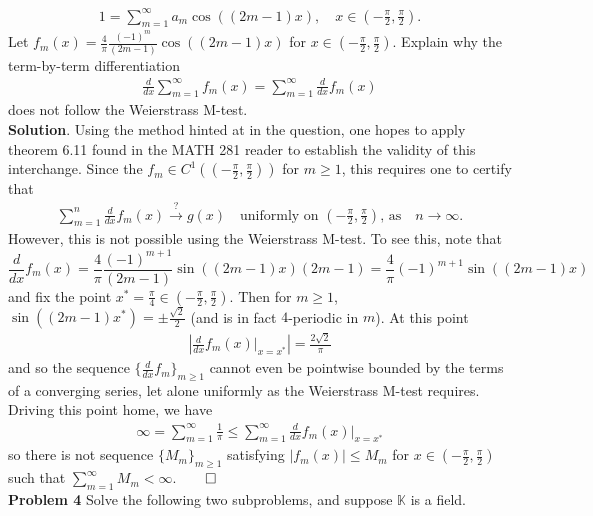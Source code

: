 \documentclass[10pt]{article}
\newcommand{\mbb}[1]{\mathbb{#1}}
\newcommand{\1}[1]{\mathbbm{1}_{#1}}
\begin{document}
    \begin{align*}
        1=\sum_{m=1}^\infty a_m\cos((2m-1)x),\quad x\in(-\tfrac{\pi}{2},\tfrac{\pi}{2}).
    \end{align*}
    Let $f_m(x)=\tfrac{4}{\pi}\tfrac{(-1)^m}{(2m-1)}\cos((2m-1)x)$ for $x\in(-\tfrac{\pi}{2},\tfrac{\pi}{2})$. Explain why the term-by-term differentiation
    \begin{align*}
        \frac{d}{dx}\sum_{m=1}^\infty f_m(x)=\sum_{m=1}^\infty\frac{d}{dx}f_m(x)
    \end{align*}
    does not follow the Weierstrass M-test.\\[5pt]
    {\bf Solution}. Using the method hinted at in the question, one hopes to apply theorem 6.11 found in the MATH 281 reader to establish the validity of this interchange.
    Since the $f_m\in C^1((-\tfrac{\pi}{2},\tfrac{\pi}{2}))$ for $m\geq 1$, this requires one to certify that
    \begin{align*}
        \sum_{m=1}^n\frac{d}{dx}f_m(x)\overset{?}{\rightarrow} g(x)\quad\text{uniformly on $(-\tfrac{\pi}{2},\tfrac{\pi}{2})$, as}\quad n\rightarrow\infty.
    \end{align*}
    However, this is not possible using the Weierstrass M-test. To see this, note that
    \[\frac{d}{dx}f_m(x)=\frac{4}{\pi}\frac{(-1)^{m+1}}{(2m-1)}\sin((2m-1)x)(2m-1)=\frac{4}{\pi}(-1)^{m+1}\sin((2m-1)x)\]
    and fix the point $x^\ast=\tfrac{\pi}{4}\in(-\tfrac{\pi}{2},\tfrac{\pi}{2})$. Then for $m\geq 1$, $\sin((2m-1)x^\ast)=\pm\tfrac{\sqrt{2}}{2}$ (and is in fact $4$-periodic in $m$). At this point
    \begin{align*}
        \left|\frac{d}{dx}f_m(x)\big|_{x=x^\ast}\right|=\frac{2\sqrt{2}}{\pi}
    \end{align*}
    and so the sequence $\{\tfrac{d}{dx}f_m\}_{m\geq 1}$ cannot even be pointwise bounded by the terms of a converging series, let alone uniformly as
    the Weierstrass M-test requires. Driving this point home, we have
    \begin{align*}
        \infty=\sum_{m=1}^\infty\frac{1}{\pi}\leq \sum_{m=1}^\infty\frac{d}{dx}f_m(x)\big|_{x=x^\ast}
    \end{align*}
    so there is not sequence $\{M_m\}_{m\geq 1}$ satisfying $|f_m(x)|\leq M_m$ for $x\in(-\tfrac{\pi}{2},\tfrac{\pi}{2})$ such that $\sum_{m=1}^\infty M_m<\infty$.\hfill{$\qed$}\\[5pt]
    {\bf Problem 4} Solve the following two subproblems, and suppose $\mbb{K}$ is a field.\\[5pt]
\end{document}
